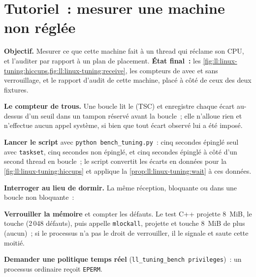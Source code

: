 \section{Tutoriel~: mesurer une machine non réglée}\label{tut:ll:linux-tuning:tut}

\begin{tutorial}
\textbf{Objectif.} Mesurer ce que cette machine fait à un thread qui réclame son CPU, et l'auditer par rapport à un plan de placement.
\textbf{État final~:} les \cref{fig:ll:linux-tuning:hiccups,fig:ll:linux-tuning:receive}, les compteurs de  avec et sans
verrouillage, et le rapport d'audit de cette machine, placé à côté de ceux des deux fixtures.
\begin{tutsteps}
\item \textbf{Le compteur de trous.} Une boucle lit le  (TSC) et enregistre chaque écart au-dessus d'un seuil dans un tampon
réservé avant la boucle~; elle n'alloue rien et n'effectue aucun appel système, si bien que tout écart observé lui a été imposé.
\label{lst:ll:linux-tuning:meter}
\item \textbf{Lancer le script} avec \texttt{python bench\_tuning.py}~: cinq secondes épinglé seul avec \texttt{taskset}, cinq secondes
non épinglé, et cinq secondes épinglé à côté d'un second thread en boucle~; le script convertit les écarts
en données pour la \cref{fig:ll:linux-tuning:hiccups} et applique la \cref{prop:ll:linux-tuning:wait} à ces données.
\item \textbf{Interroger au lieu de dormir.} La même réception, bloquante ou dans une boucle non bloquante~:
\label{lst:ll:linux-tuning:receive}
\item \textbf{Verrouiller la mémoire} et compter les défauts. Le test C++ projette 8~MiB, le touche (2\,048 défauts), puis appelle
\texttt{mlockall}, projette et touche 8~MiB de plus (aucun)~; si le processus n'a pas le droit de verrouiller, il le signale et saute cette moitié.
\label{lst:ll:linux-tuning:lock}
\item \textbf{Demander une politique temps réel} (\texttt{ll\_tuning\_bench privileges})~: un processus ordinaire reçoit \texttt{EPERM}.

\end{tutsteps}
\end{tutorial}

